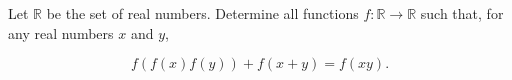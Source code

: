 Let 
$\mathbb{R}$
 be the set of real numbers. Determine all functions 
$f: \mathbb{R} \rightarrow \mathbb{R}$
 such that, for any real numbers 
$x$
 and 
$y$,
 
\[ f(f(x)f(y)) + f(x+y) = f(xy). \]
